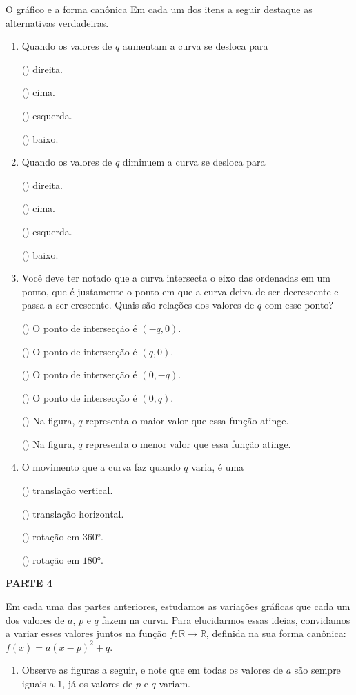 \begin{task}{O gráfico e a forma canônica}
Em cada um dos itens a seguir destaque as alternativas verdadeiras.
\begin{enumerate}
\item {} 
Quando os valores de \(q\) aumentam a curva se desloca para

(\phantom{x}) direita.

(\phantom{x}) cima.

(\phantom{x}) esquerda.

(\phantom{x}) baixo.

\item {} 
Quando os valores de \(q\) diminuem a curva se desloca para

(\phantom{x}) direita.

(\phantom{x}) cima.

(\phantom{x}) esquerda.

(\phantom{x}) baixo.

\item {} 
Você deve ter notado que a curva intersecta o eixo das ordenadas em um ponto, que é justamente o ponto em que a curva deixa de ser decrescente e passa a ser crescente. Quais são relações dos valores de \(q\) com esse ponto?

(\phantom{x}) O ponto de intersecção é \((-q,0)\).

(\phantom{x}) O ponto de intersecção é \((q,0)\).

(\phantom{x}) O ponto de intersecção é \((0,-q)\).

(\phantom{x}) O ponto de intersecção é \((0,q)\).

(\phantom{x}) Na figura, \(q\) representa o maior valor que essa função atinge.

(\phantom{x}) Na figura, \(q\) representa o menor valor que essa função atinge.

\item {} 
O movimento que a curva faz quando \(q\) varia, é uma

(\phantom{x}) translação vertical.

(\phantom{x}) translação horizontal.

(\phantom{x}) rotação em \(360°\).

(\phantom{x}) rotação em \(180°\).

\end{enumerate}

\textbf{PARTE 4}

Em cada uma das partes anteriores, estudamos as variações gráficas que cada um dos valores de \(a\), \(p\) e \(q\) fazem na curva. Para elucidarmos essas ideias, convidamos a variar esses valores juntos na função \(f:\mathbb{R}\to\mathbb{R}\), definida na sua forma canônica: \(f(x)=a(x-p)^2+q\).
\begin{enumerate}
\item {} 
Observe as figuras a seguir, e note que em todas os valores de \(a\) são sempre iguais a \(1\), já os valores de \(p\) e \(q\) variam.


\end{enumerate}
\end{task}
